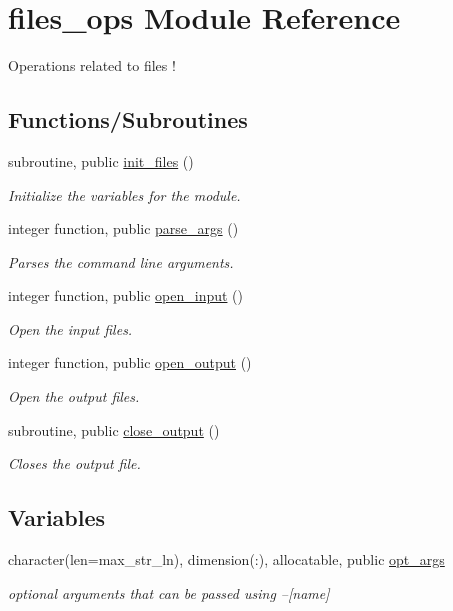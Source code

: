 \hypertarget{namespacefiles__ops}{}\section{files\+\_\+ops Module Reference}
\label{namespacefiles__ops}


Operations related to files !  


\subsection*{Functions/\+Subroutines}
\begin{DoxyCompactItemize}
\item 
subroutine, public \hyperlink{namespacefiles__ops_a1e219b1147f109f758d03bef89d540e8}{init\+\_\+files} ()
\begin{DoxyCompactList}\small\item\em Initialize the variables for the module. \end{DoxyCompactList}\item 
integer function, public \hyperlink{namespacefiles__ops_a051584112f6e4f6e60b0ef824dffbf5e}{parse\+\_\+args} ()
\begin{DoxyCompactList}\small\item\em Parses the command line arguments. \end{DoxyCompactList}\item 
integer function, public \hyperlink{namespacefiles__ops_a63a81a5a451f787025429878b2cec81b}{open\+\_\+input} ()
\begin{DoxyCompactList}\small\item\em Open the input files. \end{DoxyCompactList}\item 
integer function, public \hyperlink{namespacefiles__ops_ad681a9e8083a6f664cf0f9d17ebe279c}{open\+\_\+output} ()
\begin{DoxyCompactList}\small\item\em Open the output files. \end{DoxyCompactList}\item 
subroutine, public \hyperlink{namespacefiles__ops_a239cc017150e54eda19a8ccb0ff191cd}{close\+\_\+output} ()
\begin{DoxyCompactList}\small\item\em Closes the output file. \end{DoxyCompactList}\end{DoxyCompactItemize}
\subsection*{Variables}
\begin{DoxyCompactItemize}
\item 
character(len=max\+\_\+str\+\_\+ln), dimension(\+:), allocatable, public \hyperlink{namespacefiles__ops_a0666bcbf3aa6a9969e6dc563a40e7152}{opt\+\_\+args}
\begin{DoxyCompactList}\small\item\em optional arguments that can be passed using {\ttfamily --\mbox{[}name\mbox{]}} \end{DoxyCompactList}\end{DoxyCompactItemize}


